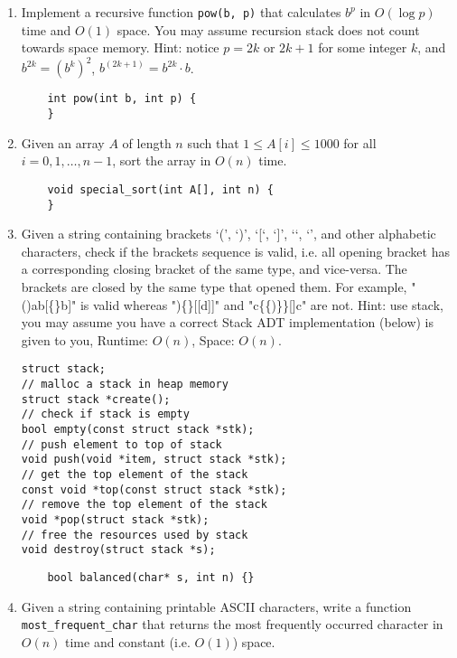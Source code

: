 \documentclass{article}
\begin{document}
\begin{enumerate}
    \item Implement a recursive function \texttt{pow(b, p)} that calculates \( b^p \) in \( O(\log p) \) time and \( O(1) \) space. You may assume recursion stack does not count towards space memory. Hint: notice \( p = 2k \) or \( 2k + 1 \) for some integer \( k \), and \( b^{2k} = (b^k)^2 \), \( b^{(2k+1)} = b^{2k} \cdot b \). 
    \begin{lstlisting}
    int pow(int b, int p) {
    }
    \end{lstlisting}
    
    \newpage
    \item Given an array \( A \) of length \( n \) such that \( 1 \leq A[i] \leq 1000 \) for all \( i = 0, 1, \ldots, n - 1 \), sort the array in \( O(n) \) time.

    \begin{lstlisting}
    void special_sort(int A[], int n) {
    }
    \end{lstlisting}
    
    \newpage
    \item Given a string containing brackets ‘(’, ‘)’, ‘[‘, ‘]’, ‘{‘, ‘}’, and other alphabetic characters, check if the brackets sequence is valid, i.e. all opening bracket has a corresponding closing bracket of the same type, and vice-versa. The brackets are closed by the same type that opened them. For example, "()ab[\{\}b]" is valid whereas ")\{\}[[d]]" and "c\{\{)\}\}[]c" are not. Hint: use stack, you may assume you have a correct Stack ADT implementation (below) is given to you, Runtime: \( O(n) \), Space: \( O(n) \).
    \begin{lstlisting}
struct stack;
// malloc a stack in heap memory
struct stack *create();
// check if stack is empty
bool empty(const struct stack *stk);
// push element to top of stack
void push(void *item, struct stack *stk);
// get the top element of the stack
const void *top(const struct stack *stk);
// remove the top element of the stack
void *pop(struct stack *stk);
// free the resources used by stack
void destroy(struct stack *s);
    \end{lstlisting}

    \begin{lstlisting}
    bool balanced(char* s, int n) {}
    \end{lstlisting}

    \newpage
    \item Given a string containing printable ASCII characters, write a function \texttt{most\_frequent\_char} that returns the most frequently occurred character in \( O(n) \) time and constant (i.e. \( O(1) \)) space.


\end{enumerate}
\end{document}
